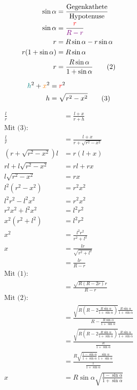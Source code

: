 \documentclass[12pt,a4paper,oneside]{article}
\begin{document}
\begin{align*}
	\sin\alpha &= \frac{\text{Gegenkathete}}{\text{Hypotenuse}} \\
	\sin\alpha &= \frac{ \textcolor{red}{r} }{ \textcolor{violet}{R-r} } \\
	r &= R\sin\alpha - r\sin\alpha \\
	r(1+\sin\alpha) &= R\sin\alpha \\
	r &= \frac{R\sin\alpha}{1+\sin\alpha} \tag{2}
\end{align*}

\begin{align*}
	\textcolor{teal}{h}^2 + \textcolor{orange}{x}^2 &= \textcolor{red}{r}^2 \\
	h &= \sqrt{r^2-x^2} \tag{3}
\end{align*}

\begin{samepage}
	\begin{align*}
		\frac{l}{r} &= \frac{l+x}{r+h} \\
		\text{Mit (3):} \\
		\frac{l}{r} &= \frac{l+x}{r+\sqrt{r^2-x^2}} \\
		(r+\sqrt{r^2-x^2})l &= r(l+x) \\
		rl + l\sqrt{r^2-x^2} &= rl+rx \\
		l\sqrt{r^2-x^2} &= rx \\
		l^2(r^2-x^2) &= r^2 x^2 \\
		l^2 r^2 - l^2 x^2 &= r^2 x^2 \\
		r^2 x^2 + l^2 x^2 &= l^2 r^2 \\
		x^2 (r^2+l^2) &= l^2 r^2 \\
		x^2 &= \frac{l^2 r^2}{r^2 + l^2} \\
		x &= \frac{lr}{\sqrt{r^2+l^2}} \\
		&= \frac{lr}{R-r} \\
		\text{Mit (1):} \\
		&= \frac{\sqrt{R(R-2r)}r}{R-r} \\
		\text{Mit (2):} \\
		&= \frac{\sqrt{R(R-2\frac{R\sin\alpha}{1+\sin\alpha})}\frac{R\sin\alpha}{1+\sin\alpha}}{R-\frac{R\sin\alpha}{1+\sin\alpha}} \\
		&= \frac{\sqrt{R(R-2\frac{R\sin\alpha}{1+\sin\alpha})}\frac{R\sin\alpha}{1+\sin\alpha}}{\frac{R}{1+\sin\alpha}} \\
		&= \frac{R\sqrt{\frac{1-\sin\alpha}{1+\sin\alpha}}\frac{\sin\alpha}{1+\sin\alpha}}{\frac{1}{1+\sin\alpha}} \\
		x &= R\sin\alpha\sqrt{\frac{1-\sin\alpha}{1+\sin\alpha}} \tag{4}
	\end{align*}
\end{samepage} \goodbreak
\end{document}

